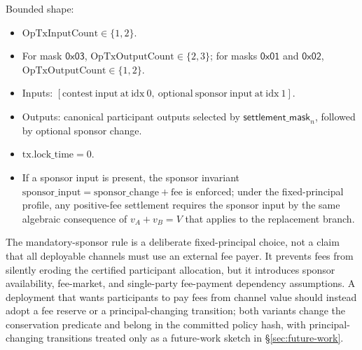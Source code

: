 \documentclass[10pt,a4paper]{article}
\begin{document}
Bounded shape:
\begin{itemize}
  \item $\mathrm{OpTxInputCount}\in\{1,2\}$.
  \item For mask $\mathsf{0x03}$, $\mathrm{OpTxOutputCount}\in\{2,3\}$; for masks $\mathsf{0x01}$ and $\mathsf{0x02}$, $\mathrm{OpTxOutputCount}\in\{1,2\}$.
  \item Inputs: $[\mathrm{contest\ input\ at\ idx\ }0,\ \mathrm{optional\ sponsor\ input\ at\ idx\ }1]$.
  \item Outputs: canonical participant outputs selected by $\mathsf{settlement\_mask}_n$, followed by optional sponsor change.
  \item $\mathrm{tx.lock\_time} = 0$.
  \item If a sponsor input is present, the sponsor invariant $\mathrm{sponsor\_input} = \mathrm{sponsor\_change} + \mathrm{fee}$ is enforced; under the fixed-principal profile, any positive-fee settlement requires the sponsor input by the same algebraic consequence of $v_A + v_B = V$ that applies to the replacement branch.
\end{itemize}

The mandatory-sponsor rule is a deliberate fixed-principal choice, not a claim that all deployable channels must use an external fee payer. It prevents fees from silently eroding the certified participant allocation, but it introduces sponsor availability, fee-market, and single-party fee-payment dependency assumptions. A deployment that wants participants to pay fees from channel value should instead adopt a fee reserve or a principal-changing transition; both variants change the conservation predicate and belong in the committed policy hash, with principal-changing transitions treated only as a future-work sketch in §\ref{sec:future-work}.
\end{document}

